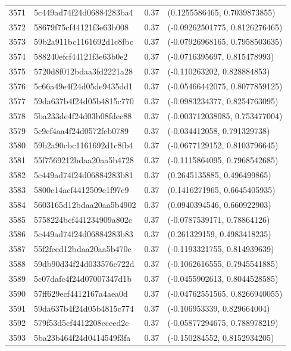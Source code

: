 \begin{table}[ht]
\begin{tabular}{rlrl}
  3571 & 5c449ad74f24d06884283ba4 & 0.37 & (0.1255586465, 0.7039873855) \\ 
  3572 & 58679f75cf44121f3e63b008 & 0.37 & (-0.09262501775, 0.8126276465) \\ 
  3573 & 59b2a911bc1161692d1c8fbc & 0.37 & (-0.07926968165, 0.7958503635) \\ 
  3574 & 588240efcf44121f3e63b0e2 & 0.37 & (-0.0716395697, 0.815478993) \\ 
  3575 & 5720d8f012bdaa3fd2221a28 & 0.37 & (-0.110263202, 0.828884853) \\ 
  3576 & 5c66a49e4f24d05de9435dd1 & 0.37 & (-0.05466442075, 0.8077859125) \\ 
  3577 & 59da637b4f24d05b4815c770 & 0.37 & (-0.0983234377, 0.8254763095) \\ 
  3578 & 5ba233de4f24d03b08fdee88 & 0.37 & (-0.003712038085, 0.753477004) \\ 
  3579 & 5c9cf4aa4f24d0572feb0789 & 0.37 & (-0.034412058, 0.791329738) \\ 
  3580 & 59b2a90cbc1161692d1c8fb4 & 0.37 & (-0.0677129152, 0.8103796645) \\ 
  3581 & 55f7569212bdaa20aa5b4728 & 0.37 & (-0.1115864095, 0.7968542685) \\ 
  3582 & 5c449ad74f24d06884283b81 & 0.37 & (0.2645135885, 0.496499865) \\ 
  3583 & 5800c14acf4412509e1f97c9 & 0.37 & (0.1416271965, 0.6645405935) \\ 
  3584 & 5603165d12bdaa20aa5b4902 & 0.37 & (0.0940394546, 0.660922903) \\ 
  3585 & 5758224bcf441234909a802c & 0.37 & (-0.0787539171, 0.78864126) \\ 
  3586 & 5c449ad74f24d06884283b83 & 0.37 & (0.261329159, 0.4983418235) \\ 
  3587 & 55f2feed12bdaa20aa5b470e & 0.37 & (-0.1193321755, 0.814939639) \\ 
  3588 & 59db90d34f24d033576c722d & 0.37 & (-0.1062616555, 0.7945541885) \\ 
  3589 & 5c07dafc4f24d07007347d1b & 0.37 & (-0.0455902613, 0.8044528585) \\ 
  3590 & 57ff629ecf4412167a4aea0d & 0.37 & (-0.04762551565, 0.8266940055) \\ 
  3591 & 59da637b4f24d05b4815c774 & 0.37 & (-0.106953339, 0.829664004) \\ 
  3592 & 579f53d5cf4412208cceed2c & 0.37 & (-0.05877294675, 0.788978219) \\ 
  3593 & 5ba23b464f24d0414549f3fa & 0.37 & (-0.150284552, 0.8152934205) \\ 

\end{tabular}
\end{table}
